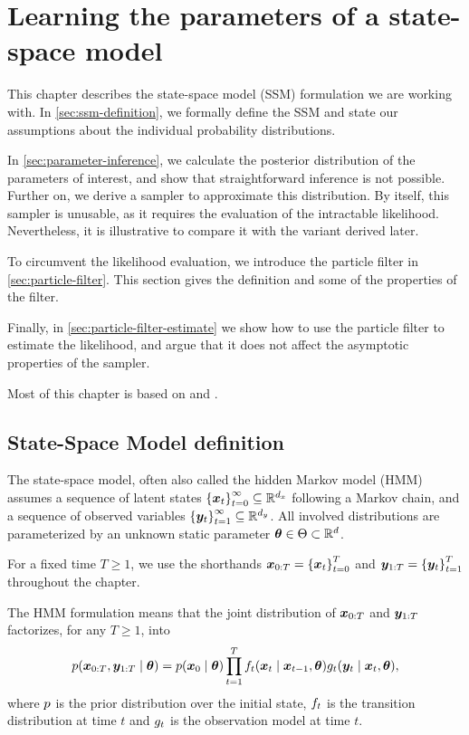 \chapter{Learning the parameters of a state-space model}
\label{chap:inference}

This chapter describes the state-space model (SSM) formulation we are working with. In \autoref{sec:ssm-definition}, we formally define the SSM and state our assumptions about the individual probability distributions.

In \autoref{sec:parameter-inference}, we calculate the posterior distribution of the parameters of interest, and show that straightforward inference is not possible. Further on, we derive a sampler to approximate this distribution. By itself, this sampler is unusable, as it requires the evaluation of the intractable likelihood. Nevertheless, it is illustrative to compare it with the variant derived later.

To circumvent the likelihood evaluation, we introduce the particle filter in \autoref{sec:particle-filter}. This section gives the definition and some of the properties of the filter.

Finally, in \autoref{sec:particle-filter-estimate} we show how to use the particle filter to estimate the likelihood, and argue that it does not affect the asymptotic properties of the sampler.

Most of this chapter is based on \cite{andrieu} and \cite{schoen}.



\section{State-Space Model definition} \label{sec:ssm-definition}
The state-space model, often also called the hidden Markov model (HMM) assumes a sequence of latent states $\left\{\bm{x}_t\right\}_{t=0}^\infty \subseteq \mathbb{R}^{d_x}$ following a Markov chain, and a sequence of observed variables $\left\{\bm{y}_t\right\}_{t=1}^\infty \subseteq \mathbb{R}^{d_y}$. All involved distributions are parameterized by an unknown static parameter $\bm{\theta} \in \Theta \subset \mathbb{R}^d$.

For a fixed time $T \geq 1$, we use the shorthands $\bm{x}_{0:T} = \left\{\bm{x}_t\right\}_{t=0}^T$ and $\bm{y}_{1:T} = \left\{\bm{y}_t\right\}_{t=1}^T$ throughout the chapter.

The HMM formulation means that the joint distribution of $\bm{x}_{0:T}$ and $\bm{y}_{1:T}$ factorizes, for any $T \geq 1$, into
\begin{equation}\label{eq:factorization}
p(\bm{x}_{0:T}, \bm{y}_{1:T} \mid \bm{\theta}) = p(\bm{x}_0 \mid \bm{\theta}) \prod_{t = 1}^{T} f_t(\bm{x}_t \mid \bm{x}_{t-1}, \bm{\theta}) g_t(\bm{y}_t \mid \bm{x}_t, \bm{\theta}),
\end{equation}
where $p$ is the prior distribution over the initial state, $f_t$ is the transition distribution at time $t$ and $g_t$ is the observation model at time $t$.

